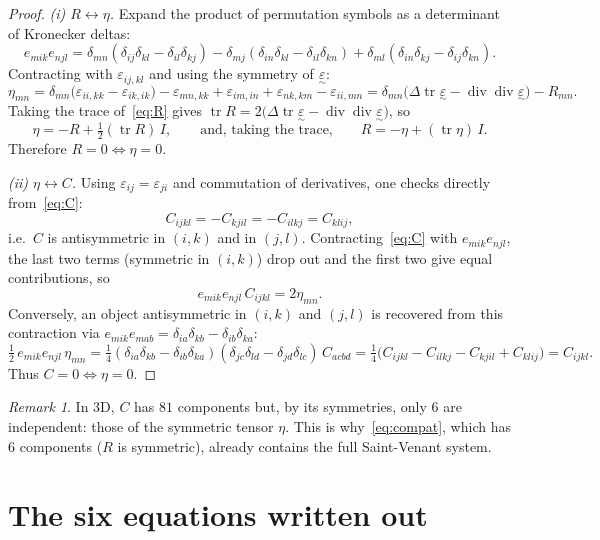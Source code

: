 \documentclass[11pt,a4paper]{article}
\theoremstyle{remark}
\newtheorem{remark}{Remark}
\newcommand{\eps}{\varepsilon}
\newcommand{\teps}{\underset{\sim}{\varepsilon}}
\newcommand{\tr}{\operatorname{tr}}
\begin{document}
\begin{proof}
\emph{(i) $R \leftrightarrow \eta$.} Expand the product of permutation symbols as a determinant of Kronecker deltas:
\[
  e_{mik}e_{njl}=\delta_{mn}(\delta_{ij}\delta_{kl}-\delta_{il}\delta_{kj})
  -\delta_{mj}(\delta_{in}\delta_{kl}-\delta_{il}\delta_{kn})
  +\delta_{ml}(\delta_{in}\delta_{kj}-\delta_{ij}\delta_{kn}).
\]
Contracting with $\eps_{ij,kl}$ and using the symmetry of $\teps$:
\[
  \eta_{mn}
  =\delta_{mn}\big(\eps_{ii,kk}-\eps_{ik,ik}\big)
   -\eps_{mn,kk}+\eps_{im,in}+\eps_{nk,km}-\eps_{ii,mn}
  =\delta_{mn}\big(\Delta\tr\teps-\operatorname{div}\operatorname{div}\teps\big)-R_{mn}.
\]
Taking the trace of~\eqref{eq:R} gives $\tr R = 2\big(\Delta\tr\teps-\operatorname{div}\operatorname{div}\teps\big)$, so
\begin{equation}\label{eq:etaR}
  \eta = -R+\tfrac12(\tr R)\,I,
  \qquad\text{and, taking the trace,}\qquad
  R = -\eta+(\tr\eta)\,I .
\end{equation}
Therefore $R=0\iff\eta=0$.

\smallskip
\emph{(ii) $\eta \leftrightarrow C$.} Using $\eps_{ij}=\eps_{ji}$ and commutation of derivatives, one checks directly from~\eqref{eq:C}:
\[
  C_{ijkl}=-C_{kjil}=-C_{ilkj}=C_{klij},
\]
i.e.\ $C$ is antisymmetric in $(i,k)$ and in $(j,l)$. Contracting~\eqref{eq:C} with $e_{mik}e_{njl}$, the last two terms (symmetric in $(i,k)$) drop out and the first two give equal contributions, so
\[
  e_{mik}e_{njl}\,C_{ijkl}=2\eta_{mn}.
\]
Conversely, an object antisymmetric in $(i,k)$ and $(j,l)$ is recovered from this contraction via $e_{mik}e_{mab}=\delta_{ia}\delta_{kb}-\delta_{ib}\delta_{ka}$:
\[
  \tfrac12\,e_{mik}e_{njl}\,\eta_{mn}
  =\tfrac14(\delta_{ia}\delta_{kb}-\delta_{ib}\delta_{ka})(\delta_{jc}\delta_{ld}-\delta_{jd}\delta_{lc})\,C_{acbd}
  =\tfrac14\big(C_{ijkl}-C_{ilkj}-C_{kjil}+C_{klij}\big)=C_{ijkl}.
\]
Thus $C=0\iff\eta=0$.
\end{proof}

\begin{remark}
In 3D, $C$ has $81$ components but, by its symmetries, only $6$ are independent: those of the symmetric tensor $\eta$. This is why~\eqref{eq:compat}, which has $6$ components ($R$ is symmetric), already contains the full Saint-Venant system.
\end{remark}

\section{The six equations written out}
\end{document}
